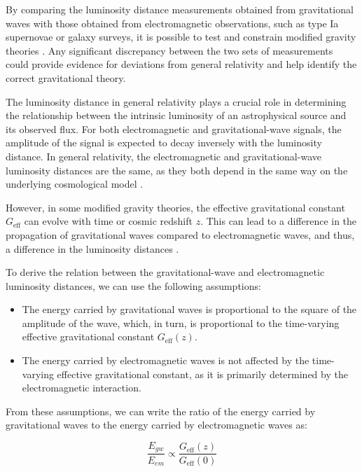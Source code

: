 \documentclass[universe,article,accept,moreauthors,pdftex]{Definitions/mdpi}
\newcommand{\be}{\begin{equation}}
\newcommand{\ee}{\end{equation}}
\begin{document}
By comparing the luminosity distance measurements obtained from gravitational waves with those obtained from electromagnetic observations, such as type Ia supernovae or galaxy surveys, it is possible to test and constrain modified gravity theories \cite{10.1093/acprof:oso/9780198570745.001.0001,10.1093/oso/9780198570899.001.0001}. Any significant discrepancy between the two sets of measurements could provide evidence for deviations from general relativity and help identify the correct gravitational theory.

The luminosity distance in general relativity plays a crucial role in determining the relationship between the intrinsic luminosity of an astrophysical source and its observed flux. For both electromagnetic and gravitational-wave signals, the amplitude of the signal is expected to decay inversely with the luminosity distance. In general relativity, the electromagnetic and gravitational-wave luminosity distances are the same, as they both depend in the  same way on the underlying cosmological model \cite{10.1093/acprof:oso/9780198570745.001.0001,10.1093/oso/9780198570899.001.0001}.

However, in some modified gravity theories, the effective gravitational constant $G_{\text{eff}}$ can evolve with time or cosmic redshift $z$. This can lead to a difference in the propagation of gravitational waves compared to electromagnetic waves, and thus, a difference in the luminosity distances \cite{Linder_2018}.

To derive the relation between the gravitational-wave and electromagnetic luminosity distances, we can use the following assumptions:

\begin{itemize}
\item The energy carried by gravitational waves is proportional to the square of the amplitude of the wave, which, in turn, is proportional to the time-varying effective gravitational constant $G_{\text{eff}}(z)$.

\item The energy carried by electromagnetic waves is not affected by the time-varying effective gravitational constant, as it is primarily determined by the electromagnetic interaction.
\end{itemize}

From these assumptions, we can write the ratio of the energy carried by gravitational waves to the energy carried by electromagnetic waves as:

\be
\frac{E_{gw}}{E_{em}} \propto \frac{G_{\text{eff}}(z)}{G_{\text{eff}}(0)}
\ee
\end{document}
